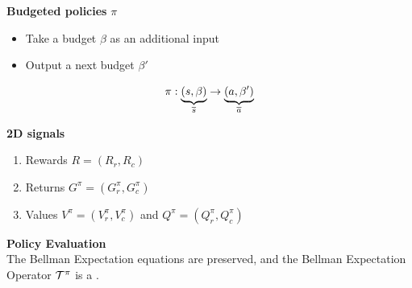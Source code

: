 \documentclass[a0paper,portrait,fontscale=0.355, margin=2cm]{baposter}
\begin{document}
\begin{poster}
{\textbf{Budgeted policies} $\pi$
\begin{itemize}
    \item Take a budget $\beta$ as an additional input
    \item Output a next budget $\beta'$ 
\end{itemize}
\begin{equation*}
    \pi:\underbrace{(s,\beta)}_{\overline{s}} \rightarrow \underbrace{(a,\beta')}_{\overline{a}}
\end{equation*}

\textbf{2D  signals}
\begin{enumerate}
    \item Rewards $R = (R_r, R_c)$
    \item Returns $G^\pi = (G_r^\pi, G_c^\pi)$
    \item Values $V^\pi = (V_r^\pi, V_c^\pi)$ and $Q^\pi = (Q_r^\pi, Q_c^\pi)$\\
\end{enumerate}

\textbf{Policy Evaluation}\\

The Bellman Expectation equations%
are preserved, and the Bellman Expectation Operator $\mathcal{T}^\pi$ is a .
}

\end{poster}
\end{document}
